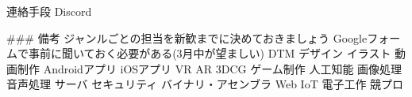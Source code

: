         連絡手段
            Discord

### 備考
    ジャンルごとの担当を新歓までに決めておきましょう
    Googleフォームで事前に聞いておく必要がある(3月中が望ましい)
        DTM
        デザイン
        イラスト
        動画制作
        Androidアプリ
        iOSアプリ
        VR
        AR
        3DCG
        ゲーム制作
        人工知能
        画像処理
        音声処理
        サーバ
        セキュリティ
        バイナリ・アセンブラ
        Web
        IoT
        電子工作
        競プロ


        
                    
                
        

    

    

